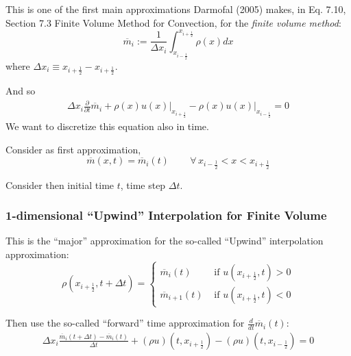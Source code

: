 \documentclass[10pt]{amsart}
\begin{document}
\begin{multicols*}{2}
This is one of the first main approximations Darmofal (2005) \cite{Darm2005} makes, in Eq. 7.10, Section 7.3 Finite Volume Method for Convection, for the \emph{finite volume method}:
\begin{equation}
  \overline{m}_i := \frac{1}{\Delta x_i} \int_{x_{i - \frac{1}{2} }}^{x_{i+\frac{1}{2} } } \rho(x)dx
\end{equation}
where $\Delta x_i \equiv x_{i+\frac{1}{2}} - x_{i+\frac{1}{2}}$.

And so
\begin{equation}
  \begin{gathered}
    \Delta x_i \frac{\partial }{ \partial t} \overline{m}_i + \left. \rho(x)u(x) \right|_{x_{i+\frac{1}{2} } } - \left. \rho(x)u(x) \right|_{x_{i-\frac{1}{2} } } =0
  \end{gathered}
  \end{equation}
We want to discretize this equation also in time.

Consider as first approximation,
\begin{equation}
  \overline{m}(x,t) = \overline{m}_i(t) \qquad \, \forall \, x_{i-\frac{1}{2}} < x < x_{i+\frac{1}{2}}
\end{equation}

Consider then initial time $t$, time step $\Delta t$.   

\subsubsection{1-dimensional ``Upwind'' Interpolation for Finite Volume}

This is the ``major'' approximation for the so-called ``Upwind'' interpolation approximation:
\begin{equation}\label{Eq:rhoUpwindInterp}
  \rho(x_{i+\frac{1}{2} },t+\Delta t) = \begin{cases} \overline{m}_i(t) & \text{ if } u(x_{i+\frac{1}{2} },t) > 0 \\
    \overline{m}_{i+1}(t) & \text{ if } u(x_{i+\frac{1}{2} },t) < 0
    \end{cases}
\end{equation}

Then use the so-called ``forward'' time approximation for $\frac{d}{dt} \overline{m}_i(t)$:
\[
\begin{gathered}
\Delta x_i \frac{ \overline{m}_i(t+\Delta t) - \overline{m}_i(t) }{ \Delta t} + (\rho u)(t,x_{i+\frac{1}{2} } ) - (\rho u)(t,x_{i-\frac{1}{2} } ) = 0
  \end{gathered}
\]


\end{multicols*}
\end{document}
